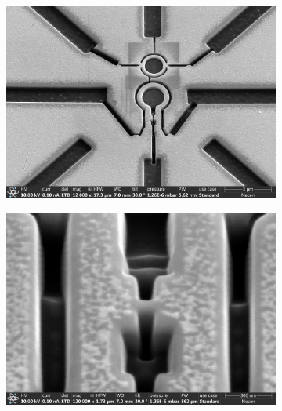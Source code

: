 \begin{figure}[ht!]
	\begin{subfigure}[t]{0.3\textwidth}
		\centering
		\def\svgwidth{\textwidth}
		\includegraphics[width=\textwidth]{figures/samples/CP1/CP1.2H_SEM_overview.jpg}
	\end{subfigure}
	\hfill
	\begin{subfigure}[t]{0.3\textwidth}
		\centering
		\includegraphics[width=\textwidth]{figures/samples/CP1/CP1.2H_SEM_junction.jpg}
	\end{subfigure}
	\hfill
	\begin{subfigure}[t]{0.3\textwidth}

\end{subfigure}
\end{figure}
